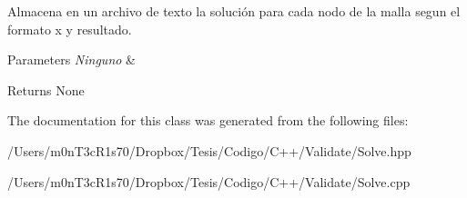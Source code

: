 Almacena en un archivo de texto la solución para cada nodo de la malla segun el formato x y resultado. 


\begin{DoxyParams}{Parameters}
{\em Ninguno} & \\
\hline
\end{DoxyParams}
\begin{DoxyReturn}{Returns}
None 
\end{DoxyReturn}


The documentation for this class was generated from the following files\+:\begin{DoxyCompactItemize}
\item 
/\+Users/m0n\+T3c\+R1s70/\+Dropbox/\+Tesis/\+Codigo/\+C++/\+Validate/Solve.\+hpp\item 
/\+Users/m0n\+T3c\+R1s70/\+Dropbox/\+Tesis/\+Codigo/\+C++/\+Validate/Solve.\+cpp\end{DoxyCompactItemize}
